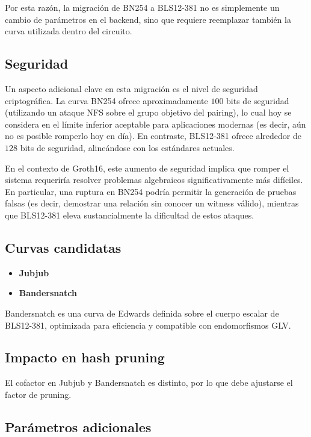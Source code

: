 \documentclass[11pt,a4paper]{article}
\begin{document}
	Por esta razón, la migración de BN254 a BLS12-381 no es simplemente un cambio de parámetros en el backend, sino que requiere reemplazar también la curva utilizada dentro del circuito.
	
	\subsection{Seguridad}
	
	Un aspecto adicional clave en esta migración es el nivel de seguridad criptográfica. La curva BN254 ofrece aproximadamente $100$ bits de seguridad (utilizando un ataque NFS sobre el grupo objetivo del pairing), lo cual hoy se considera en el límite inferior aceptable para aplicaciones modernas (es decir, aún no es posible romperlo hoy en día). En contraste, BLS12-381 ofrece alrededor de $128$ bits de seguridad, alineándose con los estándares actuales.
	
	En el contexto de Groth16, este aumento de seguridad implica que romper el sistema requeriría resolver problemas algebraicos significativamente más difíciles. En particular, una ruptura en BN254 podría permitir la generación de pruebas falsas (es decir, demostrar una relación sin conocer un witness válido), mientras que BLS12-381 eleva sustancialmente la dificultad de estos ataques.
	
	\subsection{Curvas candidatas}
	
	\begin{itemize}
		\item \textbf{Jubjub} \cite{zcashjubjub}
		\item \textbf{Bandersnatch} \cite{bandersnatch}
	\end{itemize}
	
	Bandersnatch es una curva de Edwards definida sobre el cuerpo escalar de BLS12-381, optimizada para eficiencia y compatible con endomorfismos GLV.
	
	\subsection{Impacto en hash pruning}
	
	El cofactor en Jubjub y Bandersnatch es distinto, por lo que debe ajustarse el factor de pruning.
	
	\subsection{Parámetros adicionales}
	
\end{document}
